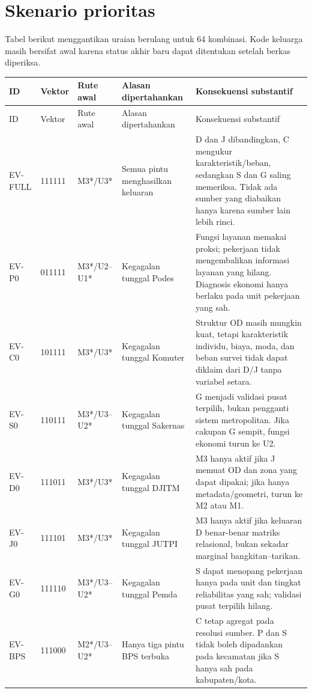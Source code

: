 \documentclass[10pt]{article}
\begin{document}
\section{Skenario prioritas}

Tabel berikut menggantikan uraian berulang untuk 64 kombinasi. Kode keluarga masih bersifat awal karena status akhir baru dapat ditentukan setelah berkas diperiksa.

\begin{longtable}{@{}P{0.09\textwidth}P{0.11\textwidth}P{0.11\textwidth}P{0.21\textwidth}P{0.31\textwidth}@{}}
\toprule
ID & Vektor & Rute awal & Alasan dipertahankan & Konsekuensi substantif \\
\midrule
\endfirsthead
\toprule
ID & Vektor & Rute awal & Alasan dipertahankan & Konsekuensi substantif \\
\midrule
\endhead
EV-FULL & 111111 & M3*/U3* & Semua pintu menghasilkan keluaran & D dan J dibandingkan, C mengukur karakteristik/beban, sedangkan S dan G saling memeriksa. Tidak ada sumber yang diabaikan hanya karena sumber lain lebih rinci. \\
EV-P0 & 011111 & M3*/U2--U1* & Kegagalan tunggal Podes & Fungsi layanan memakai proksi; pekerjaan tidak mengembalikan informasi layanan yang hilang. Diagnosis ekonomi hanya berlaku pada unit pekerjaan yang sah. \\
EV-C0 & 101111 & M3*/U3* & Kegagalan tunggal Komuter & Struktur OD masih mungkin kuat, tetapi karakteristik individu, biaya, moda, dan beban survei tidak dapat diklaim dari D/J tanpa variabel setara. \\
EV-S0 & 110111 & M3*/U3--U2* & Kegagalan tunggal Sakernas & G menjadi validasi pusat terpilih, bukan pengganti sistem metropolitan. Jika cakupan G sempit, fungsi ekonomi turun ke U2. \\
EV-D0 & 111011 & M3*/U3* & Kegagalan tunggal DJITM & M3 hanya aktif jika J memuat OD dan zona yang dapat dipakai; jika hanya metadata/geometri, turun ke M2 atau M1. \\
EV-J0 & 111101 & M3*/U3* & Kegagalan tunggal JUTPI & M3 hanya aktif jika keluaran D benar-benar matriks relasional, bukan sekadar marginal bangkitan--tarikan. \\
EV-G0 & 111110 & M3*/U3--U2* & Kegagalan tunggal Pemda & S dapat menopang pekerjaan hanya pada unit dan tingkat reliabilitas yang sah; validasi pusat terpilih hilang. \\
EV-BPS & 111000 & M2*/U3--U2* & Hanya tiga pintu BPS terbuka & C tetap agregat pada resolusi sumber. P dan S tidak boleh dipadankan pada kecamatan jika S hanya sah pada kabupaten/kota. \\

\end{longtable}
\end{document}
